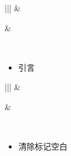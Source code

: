 \documentclass[a4paper,10pt,english]{sphinxmanual}
\begin{document}
\begin{savenotes}\sphinxattablestart
\centering
\begin{tabular}[t]{|||}
\hline
{}\relax &\relax \\
\hline\begin{sphinxfigure-in-table}
\centering

\noindent{}
\end{sphinxfigure-in-table}\relax
&\begin{sphinxfigure-in-table}
\centering

\noindent{}
\end{sphinxfigure-in-table}\relax
\\
\hline
\end{tabular}
\par
\sphinxattableend\end{savenotes}
\begin{itemize}
\item {} 
引言

\end{itemize}


\begin{savenotes}\sphinxattablestart
\centering
\begin{tabular}[t]{|||}
\hline
{}\relax &\relax \\
\hline\begin{sphinxfigure-in-table}
\centering

\noindent{}
\end{sphinxfigure-in-table}\relax
&\begin{sphinxfigure-in-table}
\centering

\noindent{}
\end{sphinxfigure-in-table}\relax
\\
\hline
\end{tabular}
\par
\sphinxattableend\end{savenotes}
\begin{itemize}
\item {} 
清除标记空白

\end{itemize}
\end{document}
